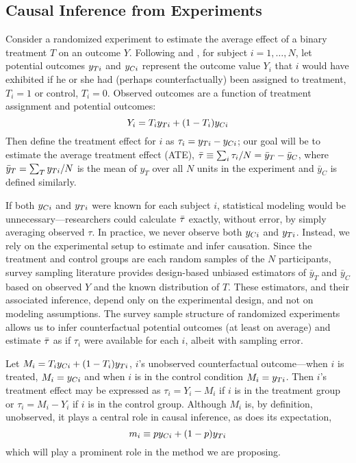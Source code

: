 \subsection{Causal Inference from Experiments}
Consider a randomized experiment to estimate the average
effect of a binary treatment $T$ on an outcome $Y$.
Following \citet{neyman:1923} and \citet{rubin1974estimating}, for subject $i=1,\dots,N$,
let potential outcomes $y_{Ti}$ and $y_{Ci}$ represent the outcome value
$Y_i$ that $i$ would have exhibited if he or she had (perhaps
counterfactually) been assigned to treatment, $T_i=1$ or control,
$T_i=0$.
Observed outcomes are a function of treatment assignment and
potential outcomes:
\begin{equation*}
  Y_i=T_iy_{Ti}+(1-T_i)y_{Ci}
\end{equation*}
Then define the treatment effect for $i$ as $\tau_i=y_{Ti}-y_{Ci}$; our goal will be
to estimate the average treatment effect (ATE),
$\bar{\tau}\equiv\sum_i\tau_i/N=\bar{y}_T-\bar{y}_C$, where
$\bar{y}_T=\sum_T{y_{Ti}}/N$ is the mean of $y_T$ over all $N$ units in
the experiment and $\bar{y}_C$ is defined similarly.

If both $y_{Ci} $ and $y_{Ti} $ were known for each subject $i$,
statistical modeling would be unnecessary---researchers could
calculate $\bar{\tau} $ exactly, without error, %
by simply averaging observed $\tau$.
In practice, we never observe both $y_{Ci}$ and $y_{Ti}$.
Instead, we rely on the experimental setup to estimate and infer
causation.
Since the treatment and control groups are each random samples of
the $N$ participants, survey sampling literature provides design-based
unbiased estimators of $\bar{y}_T$ and $\bar{y}_C$ based on observed $Y$
and the known distribution of $T$.
These estimators, and their associated inference, depend only on the
experimental design, and not on modeling assumptions.
The survey sample structure of randomized experiments allows us to
infer counterfactual potential outcomes (at least on average) and estimate $\bar{\tau}$ as if
$\tau_i$ were available for each $i$, albeit with sampling error.

Let $M_i=T_iy_{Ci}+(1-T_i)y_{Ti}$, $i$'s unobserved
counterfactual outcome---when $i$ is treated, $M_i=y_{Ci}$ and when $i$
is in the control condition $M_i=y_{Ti}$.
Then $i$'s treatment effect may be expressed as $\tau_i=Y_i-M_i$ if
$i$ is in the treatment group or $\tau_i=M_i-Y_i$ if $i$ is in the
control group.
Although $M_i$ is, by definition, unobserved, it plays a central role in
causal inference, as does its expectation,
\begin{equation*}
m_i\equiv py_{Ci}+(1-p)y_{Ti}
\end{equation*}
which will play a prominent role in the method we are proposing.

